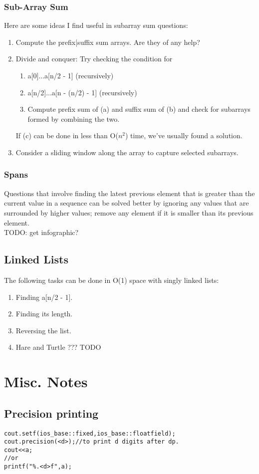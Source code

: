 \documentclass{article}
\begin{document}
\subsubsection{Sub-Array Sum}
Here are some ideas I find useful in subarray sum questions:
\begin{enumerate}
    \item Compute the prefix|suffix sum arrays. Are they of any help?
    \item Divide and conquer: Try checking the condition for
    \begin{enumerate}
        \item a[0]...a[n/2 - 1] (recursively)
        \item a[n/2]...a[n - (n/2) - 1] (recursively)
        \item Compute prefix sum of (a) and suffix sum of (b)
        and check for subarrays formed by combining the two.
    \end{enumerate}
    If (c) can be done in less than O($n^2$) time, we've usually found a solution.
    \item Consider a sliding window along the array to capture selected
    subarrays. 
\end{enumerate}
\subsubsection{Spans}
Questions that involve finding the latest previous element that is greater than the 
current value in a sequence can be solved better by ignoring any values that are
surrounded by higher values; remove any element if it is smaller than its previous
element.\\
TODO: get infographic?
\subsection{Linked Lists}
The following tasks can be done in O(1) space with singly linked lists:
\begin{enumerate}
    \item Finding a[n/2 - 1].
    \item Finding its length.
    \item Reversing the list.
    \item Hare and Turtle ??? TODO
\end{enumerate}
\section*{Misc. Notes}
\subsection*{Precision printing}
\begin{lstlisting}
cout.setf(ios_base::fixed,ios_base::floatfield);
cout.precision(<d>);//to print d digits after dp.
cout<<a;
//or
printf("%.<d>f",a);
\end{lstlisting}
\end{document}
